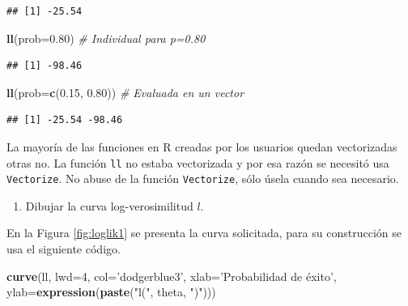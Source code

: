 \documentclass[10pt,]{krantz}
\makeatletter
\newenvironment{Shaded}{\begin{snugshade}}{\end{snugshade}}
\newcommand{\KeywordTok}[1]{\textcolor[rgb]{0.13,0.29,0.53}{\textbf{{#1}}}}
\newcommand{\DataTypeTok}[1]{\textcolor[rgb]{0.13,0.29,0.53}{{#1}}}
\newcommand{\DecValTok}[1]{\textcolor[rgb]{0.00,0.00,0.81}{{#1}}}
\newcommand{\FloatTok}[1]{\textcolor[rgb]{0.00,0.00,0.81}{{#1}}}
\newcommand{\StringTok}[1]{\textcolor[rgb]{0.31,0.60,0.02}{{#1}}}
\newcommand{\CommentTok}[1]{\textcolor[rgb]{0.56,0.35,0.01}{\textit{{#1}}}}
\newcommand{\NormalTok}[1]{{#1}}
\providecommand{\tightlist}{%
  \setlength{\itemsep}{0pt}\setlength{\parskip}{0pt}}
\let\proglang=\textsf
\newenvironment{kframe}{%
\medskip{}
\setlength{\fboxsep}{.8em}
 \def\at@end@of@kframe{}%
 \ifinner\ifhmode%
  \def\at@end@of@kframe{\end{minipage}}%
  \begin{minipage}{\columnwidth}%
 \fi\fi%
 \def\FrameCommand##1{\hskip\@totalleftmargin \hskip-\fboxsep
 \colorbox{shadecolor}{##1}\hskip-\fboxsep
     \hskip-\linewidth \hskip-\@totalleftmargin \hskip\columnwidth}%
 \MakeFramed {\advance\hsize-\width
   \@totalleftmargin\z@ \linewidth\hsize
   \@setminipage}}%
 {\par\unskip\endMakeFramed%
 \at@end@of@kframe}
\renewenvironment{Shaded}{\begin{kframe}}{\end{kframe}}
\let\BeginKnitrBlock\begin \let\EndKnitrBlock\end
\makeatother
\begin{document}
\begin{verbatim}
## [1] -25.54
\end{verbatim}

\begin{Shaded}
\begin{Highlighting}[]
\KeywordTok{ll}\NormalTok{(}\DataTypeTok{prob=}\FloatTok{0.80}\NormalTok{)  }\CommentTok{# Individual para p=0.80}
\end{Highlighting}
\end{Shaded}

\begin{verbatim}
## [1] -98.46
\end{verbatim}

\begin{Shaded}
\begin{Highlighting}[]
\KeywordTok{ll}\NormalTok{(}\DataTypeTok{prob=}\KeywordTok{c}\NormalTok{(}\FloatTok{0.15}\NormalTok{, }\FloatTok{0.80}\NormalTok{))  }\CommentTok{# Evaluada en un vector }
\end{Highlighting}
\end{Shaded}

\begin{verbatim}
## [1] -25.54 -98.46
\end{verbatim}

\BeginKnitrBlock{rmdwarning}
La mayoría de las funciones en \proglang{R} creadas por los usuarios
quedan vectorizadas otras no. La función \texttt{ll} no estaba
vectorizada y por esa razón se necesitó usa \texttt{Vectorize}. No abuse
de la función \texttt{Vectorize}, sólo úsela cuando sea necesario.
\EndKnitrBlock{rmdwarning}

\begin{enumerate}
\def\labelenumi{\arabic{enumi})}
\setcounter{enumi}{2}
\tightlist
\item
  Dibujar la curva log-verosimilitud \(l\).
\end{enumerate}

En la Figura \ref{fig:loglik1} se presenta la curva solicitada, para su
construcción se usa el siguiente código.

\begin{Shaded}
\begin{Highlighting}[]
\KeywordTok{curve}\NormalTok{(ll, }\DataTypeTok{lwd=}\DecValTok{4}\NormalTok{, }\DataTypeTok{col=}\StringTok{'dodgerblue3'}\NormalTok{,}
      \DataTypeTok{xlab=}\StringTok{'Probabilidad de éxito'}\NormalTok{,}
      \DataTypeTok{ylab=}\KeywordTok{expression}\NormalTok{(}\KeywordTok{paste}\NormalTok{(}\StringTok{"l("}\NormalTok{, theta, }\StringTok{")"}\NormalTok{)))}
\end{Highlighting}
\end{Shaded}
\end{document}

